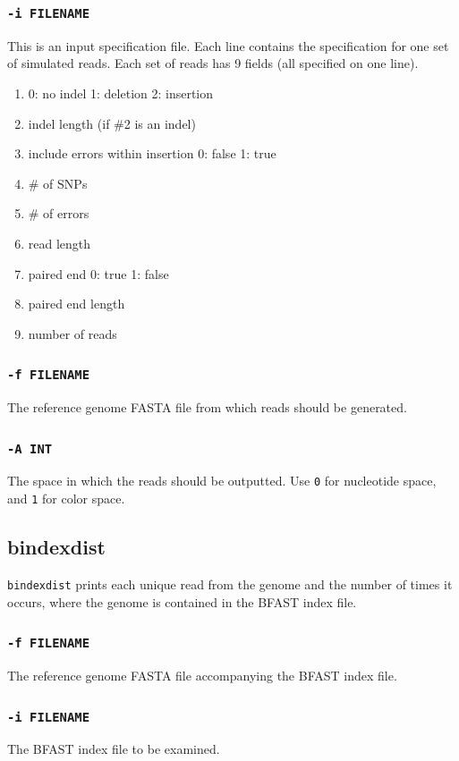\documentclass[a4paper,12pt]{book}
\newcommand{\TT}[1]{{\tt #1}} %
\newcommand{\rGFF}{reference genome FASTA file}
\newcommand{\BIF}{BFAST index file} %
\begin{document}
\subsubsection{\TT{-i FILENAME}}
This is an input specification file.
Each line contains the specification for one set of simulated reads.
Each set of reads has 9 fields (all specified on one line).
\begin{enumerate}
	\item 0: no indel 1: deletion 2: insertion
	\item indel length (if \#2 is an indel)
	\item include errors within insertion 0: false 1: true
	\item \# of SNPs
	\item \# of errors
	\item read length
	\item paired end 0: true 1: false
	\item paired end length
	\item number of reads
\end{enumerate}

\subsubsection{\TT{-f FILENAME}}
The \rGFF{} from which reads should be generated.

\subsubsection{\TT{-A INT}}
The space in which the reads should be outputted.
Use \TT{0} for nucleotide space, and \TT{1} for color space.

\subsection{bindexdist}
\label{sec:bindexdist}
\TT{bindexdist} prints each unique read from the genome and the number of times it occurs, where the genome is contained in the \BIF{}.

\subsubsection{\TT{-f FILENAME}}
The \rGFF{} accompanying the \BIF{}.

\subsubsection{\TT{-i FILENAME}}
The \BIF{} to be examined.
\end{document}
